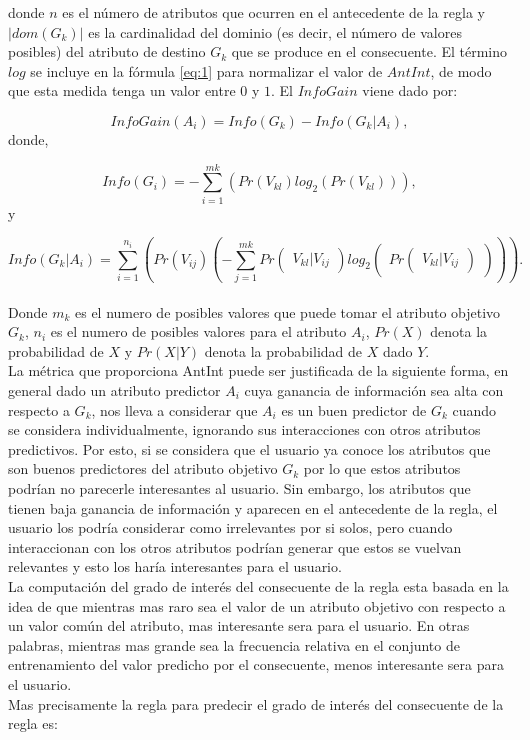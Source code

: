 \noindent
donde $n$ es el número de atributos que ocurren en el antecedente de la regla y $|dom(G_k)|$ es la cardinalidad del dominio (es decir, el número de valores posibles) del atributo de destino $G_k$ que se produce en el consecuente. El término $log$ se incluye en la fórmula \ref{eq:1} para normalizar el valor de $AntInt$, de modo que esta medida tenga un valor entre $0$ y $1$. El $InfoGain$ viene dado por:


\begin{equation} \label{eq:2}
InfoGain(A_i)=Info(G_k)-Info(\left.G_k\right| A_i),
\end{equation}
donde,

\begin{equation}  \label{eq:3}
Info(G_i)=-\sum\limits_{i=1}^{mk}\left(Pr(V_{kl}) log_2 (Pr(V_{kl}))\right),
\end{equation}
y

\begin{equation} \label{eq:4}
Info(\left. G_k \right| A_i)=\sum\limits_{i=1}^{n_i}\left( Pr(V_{ij})\left(-\sum\limits_{j=1}^{mk} Pr\begin{pmatrix}V_{kl}|V_{ij}\end{pmatrix} log_2 \begin{pmatrix}Pr\begin{pmatrix}V_{kl}|V_{ij}\end{pmatrix}\end{pmatrix}\right)  \right).
\end{equation}
\\
Donde $m_k$ es el numero de posibles valores que puede tomar el atributo objetivo $G_k$, $n_i$ es el numero de posibles valores para el atributo $A_i$, $Pr(X)$ denota la probabilidad de $X$ y $Pr(X|Y)$ denota la probabilidad de $X$ dado $Y$.
\\
La métrica que proporciona AntInt puede ser justificada de la siguiente forma, en general dado un atributo predictor $A_i$ cuya ganancia de información sea alta con respecto a $G_k$, nos lleva a considerar que $A_i$ es un buen predictor de $G_k$ cuando se considera individualmente, ignorando sus interacciones con otros atributos predictivos. Por esto, si se considera que el usuario ya conoce los atributos que son buenos predictores del atributo objetivo $G_k$ por lo que estos atributos podrían no parecerle interesantes al usuario. Sin embargo, los atributos que tienen baja ganancia de información y aparecen en el antecedente de la regla, el usuario los podría considerar como irrelevantes por si solos, pero cuando interaccionan con los otros atributos podrían generar que estos se vuelvan relevantes y esto los haría interesantes para el usuario.
\\
La computación del grado de interés del consecuente de la regla esta basada en la idea de que mientras mas raro sea el valor de un atributo objetivo con respecto a un valor común del atributo, mas interesante sera para el usuario. En otras palabras, mientras mas grande sea la frecuencia relativa en el conjunto de entrenamiento del valor predicho por el consecuente, menos interesante sera para el usuario.
\\
Mas precisamente la regla para predecir el grado de interés del consecuente de la regla es:

